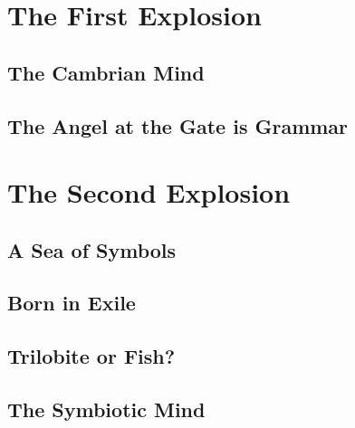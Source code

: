 \documentclass[12pt,letterpaper]{book}
\begin{document}
\part{The First Explosion}









\chapter{The Cambrian Mind}

\chapter{The Angel at the Gate is Grammar}

\part{The Second Explosion}

\chapter{A Sea of Symbols}

\chapter{Born in Exile}

\chapter{Trilobite or Fish?}



\chapter{The Symbiotic Mind}

\backmatter



\printbibliography
\end{document}
